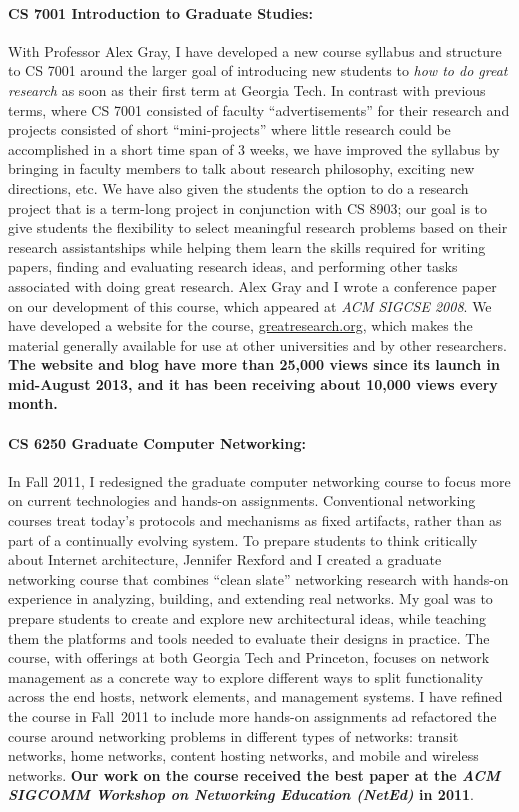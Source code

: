\documentclass{article}
\begin{document}
\begin{cv}{}
\paragraph{CS 7001 Introduction to Graduate Studies:}
With Professor Alex Gray, I have developed a new course syllabus and
structure to CS 7001 around the larger goal of introducing new students
to {\em how to do great research} as soon as their first term at Georgia
Tech.  In contrast with previous terms, where CS 7001 consisted of
faculty ``advertisements'' for their research and projects consisted of
short ``mini-projects'' where little research could be accomplished in a
short time span of 3 weeks, we have improved the syllabus by bringing in
faculty members to talk about research philosophy, exciting new
directions, etc.  We have also given the students the option to do a
research project that is a term-long project in conjunction with CS
8903; our goal is to give students the flexibility to select meaningful
research problems based on their research assistantships while helping
them learn the skills required for writing papers, finding and
evaluating research ideas, and performing other tasks associated with
doing great research.  Alex Gray and I wrote a conference paper on our
development of this course, which appeared at {\em ACM SIGCSE 2008}.  We
have developed a website for the course, \url{greatresearch.org}, which
makes the material generally available for use at other universities and
by other researchers.  {\bf The website and blog have more than 25,000 views
since its launch in mid-August 2013, and it has been receiving about
10,000 views every month.}

\paragraph{CS 6250 Graduate Computer Networking:} In Fall 2011, I redesigned the
graduate computer networking course to focus more on current
technologies and hands-on assignments.  Conventional networking courses
treat today's protocols and mechanisms as fixed artifacts, rather than
as part of a continually evolving system.  To prepare students to think
critically about Internet architecture, Jennifer Rexford and I created a
graduate networking course that combines ``clean slate'' networking
research with hands-on experience in analyzing, building, and extending
real networks.  My goal was to prepare students to create and explore
new architectural ideas, while teaching them the platforms and tools
needed to evaluate their designs in practice.  The course, with
offerings at both Georgia Tech and Princeton, focuses on network
management as a concrete way to explore different ways to split
functionality across the end hosts, network elements, and management
systems.  I have refined the course in Fall~2011 to include more
hands-on assignments ad refactored the course around networking problems
in different types of networks: transit networks, home networks, content
hosting networks, and mobile and wireless networks.  {\bf Our work on
  the course received the best paper at the {\em ACM SIGCOMM Workshop on
    Networking Education (NetEd)} in 2011}.


\end{cv}
\end{document}
